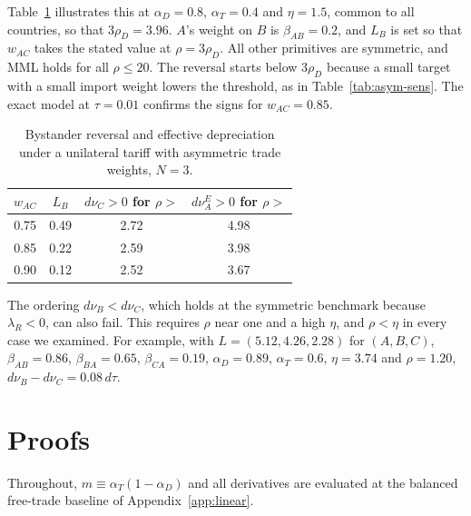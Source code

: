 \documentclass[11pt]{article}
\begin{document}
Table~\ref{tab:neer} illustrates this at $\alpha_D=0.8$, $\alpha_T=0.4$ and $\eta=1.5$, common to all countries, so that $3\rho_D=3.96$. $A$'s weight on $B$ is $\beta_{AB}=0.2$, and $L_B$ is set so that $w_{AC}$ takes the stated value at $\rho=3\rho_D$. All other primitives are symmetric, and MML holds for all $\rho\leq20$. The reversal starts below $3\rho_D$ because a small target with a small import weight lowers the threshold, as in Table~\ref{tab:asym-sens}. The exact model at $\tau=0.01$ confirms the signs for $w_{AC}=0.85$.

\begin{table}[!htbp]
\centering
\begin{tabular}{cccc}
\toprule
$w_{AC}$ & $L_B$ & $d\nu_C>0$ for $\rho>$ & $d\nu_A^E>0$ for $\rho>$ \\
\midrule
0.75 & 0.49 & 2.72 & 4.98 \\
0.85 & 0.22 & 2.59 & 3.98 \\
0.90 & 0.12 & 2.52 & 3.67 \\
\bottomrule
\end{tabular}
\caption{Bystander reversal and effective depreciation under a unilateral tariff with asymmetric trade weights, $N=3$.}
\label{tab:neer}
\end{table}

The ordering $d\nu_B<d\nu_C$, which holds at the symmetric benchmark because $\lambda_R<0$, can also fail. This requires $\rho$ near one and a high $\eta$, and $\rho<\eta$ in every case we examined. For example, with $L=(5.12,4.26,2.28)$ for $(A,B,C)$, $\beta_{AB}=0.86$, $\beta_{BA}=0.65$, $\beta_{CA}=0.19$, $\alpha_D=0.89$, $\alpha_T=0.6$, $\eta=3.74$ and $\rho=1.20$, $d\nu_B-d\nu_C=0.08\,d\tau$.

\clearpage
\section{Proofs}

\label{app:proofs}

Throughout, $m\equiv\alpha_T(1-\alpha_D)$ and all derivatives are evaluated at the balanced free-trade baseline of Appendix~\ref{app:linear}.
\end{document}
